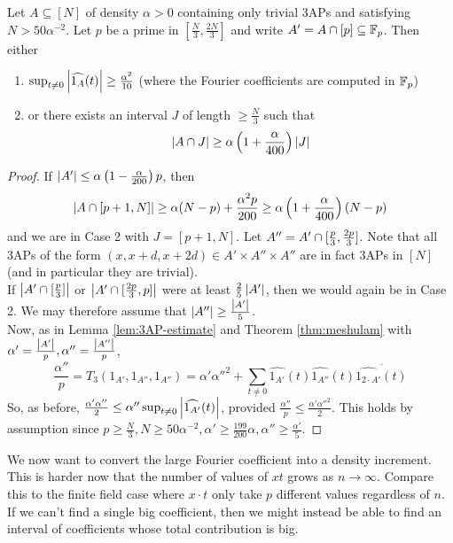 \documentclass{article}
\begin{document}
\begin{nlemma}
  Let $A \subseteq [N]$ of density $\alpha > 0$ containing only trivial 3APs and satisfying $N > 50\alpha^{-2}$. Let $p$ be a prime in $[\frac N3, \frac{2N}3]$ and write $A' = A \cap [p] \subseteq \mathbb F_p$. Then either
  \begin{enumerate}
    \item $\sup_{t \ne 0} \left\lvert \widehat{1_A}(t)\right\rvert \ge \frac{\alpha^2}{10}$ (where the Fourier coefficients are computed in $\mathbb F_p$)
    \item or there exists an interval $J$ of length $\ge \frac N3$ such that
    $$\left\lvert A \cap J\right\rvert \ge \alpha\left(1 + \frac\alpha{400}\right)\left\lvert J\right\rvert$$
  \end{enumerate}
\end{nlemma}
\begin{proof}
  If $\left\lvert A'\right\rvert \le \alpha\left(1 - \frac\alpha{200}\right)p$, then
  $$\left\lvert A \cap [p + 1, N]\right\rvert \ge \alpha(N - p) + \frac{\alpha^2p}{200} \ge \alpha\left(1 + \frac\alpha{400}\right)(N - p)$$
  and we are in Case 2 with $J = [p + 1, N]$. Let $A'' = A' \cap [\frac p3, \frac{2p}3]$. Note that all 3APs of the form $(x, x + d, x + 2d) \in A' \times A'' \times A''$ are in fact 3APs in $[N]$ (and in particular they are trivial). \\
  If $\left\lvert A' \cap [\frac p3]\right\rvert$ or $\left\lvert A' \cap [\frac{2p}3, p]\right\rvert$ were at least $\frac 25\left\lvert A'\right\rvert$, then we would again be in Case 2. We may therefore assume that $\left\lvert A''\right\rvert \ge \frac{\left\lvert A'\right\rvert}5$. \\
  Now, as in Lemma \ref{lem:3AP-estimate} and Theorem \ref{thm:meshulam} with $\alpha' = \frac{\left\lvert A'\right\rvert}p, \alpha'' = \frac{\left\lvert A''\right\rvert}p$,
  $$\frac{\alpha''}p = T_3(1_{A'}, 1_{A''}, 1_{A''}) = \alpha'\alpha''^2 + \sum_{t \ne 0}\widehat{1_{A'}}(t)\widehat{1_{A''}}(t)\overline{\widehat{1_{2 \cdot A'}}(t)}$$
  So, as before, $\frac{\alpha'\alpha''}2 \le \alpha''\sup_{t \ne 0} \left\lvert \widehat{1_{A'}}(t)\right\rvert$, provided $\frac{\alpha''}p \le \frac{\alpha'\alpha''^2}2$. This holds by assumption since $p \ge \frac N3, N \ge 50\alpha^{-2}, \alpha' \ge \frac{199}{200}\alpha, \alpha'' \ge \frac{\alpha'}5$.
\end{proof}

\newlec

We now want to convert the large Fourier coefficient into a density increment. This is harder now that the number of values of $xt$ grows as $n \to \infty$. Compare this to the finite field case where $x \cdot t$ only take $p$ different values regardless of $n$. If we can't find a single big coefficient, then we might instead be able to find an interval of coefficients whose total contribution is big.
\end{document}
